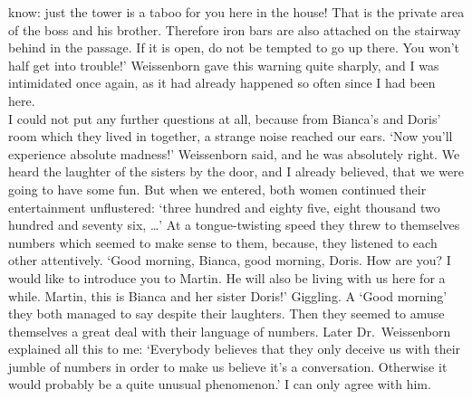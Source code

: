 know: just the tower is a taboo for you here in the house! 
That is the private area of the boss and his brother. 
Therefore iron bars are also attached on the stairway behind in the passage. 
If it is open, do not be tempted to go up there. 
You won't half get into trouble!'
Weissenborn gave this warning quite sharply, and I was intimidated once again, as it 
had already happened so often since I had been here. \\ 
I could not put any further questions at all, because from Bianca's and Doris' room 
which they lived in together, a strange noise reached our ears. 
`Now you'll experience absolute madness!' Weissenborn said, and he was absolutely right. 
We heard the laughter of the sisters by the door, and I already believed, that we 
were going to have some fun.
But when we entered, both women continued their entertainment unflustered: `three 
hundred and eighty five, eight thousand two hundred and seventy six, \dots' 
At a tongue-twisting speed they threw to themselves numbers which seemed to make 
sense to them, because, they listened to each other attentively. 
`Good morning, Bianca, good morning, Doris. How are you? 
I would like to introduce you to Martin. He will also be living with us here for a while. 
Martin, this is Bianca and her sister Doris!'
Giggling. 
A `Good morning' they both managed to say despite their laughters. 
Then they seemed to amuse themselves a great deal with their language of numbers.
Later Dr.~Weissenborn explained all this to me: 
`Everybody believes that they only deceive us with their jumble of numbers in order 
to make us believe it's a conversation. 
Otherwise it would probably be a quite unusual phenomenon.'
I can only agree with him. 


